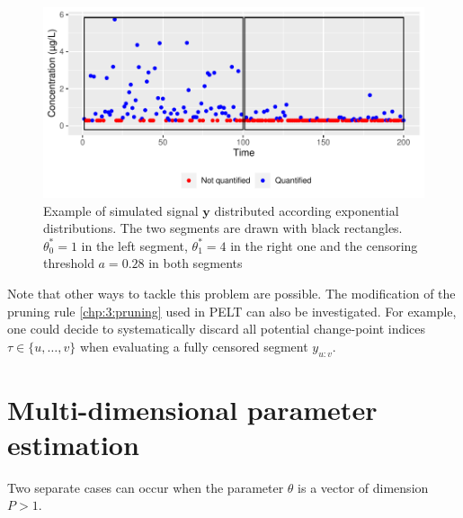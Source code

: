 \begin{figure}[ht]
    \centering
    \includegraphics{figs/Chap4/theta_max_ex.pdf}
    \caption{Example of simulated signal $\bm y$ distributed according exponential distributions. The two segments are drawn with black rectangles. $\theta^*_0 = 1$ in the left segment, $\theta^*_1 = 4$ in the right one and the censoring threshold $a = 0.28$ in both segments}
    \label{fig:theta_max}
\end{figure}

Note that other ways to tackle this problem are possible. The modification of the pruning rule \ref{chp:3:pruning} used in PELT can also be investigated. For example, one could decide to systematically discard all potential change-point indices $\tau \in \{u,\dots,v\}$ when evaluating a fully censored segment $y_{u:v}$.  

\section{Multi-dimensional parameter estimation}\label{chp:4:3}



Two separate cases can occur when the parameter $\theta$ is a vector of dimension $P > 1$.  

